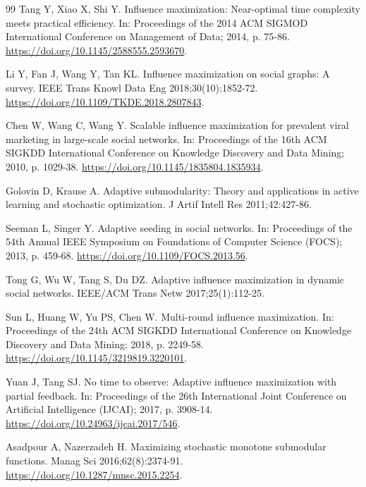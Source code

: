 \documentclass[preprint,11pt]{elsarticle}
\theoremstyle{definition}
\theoremstyle{remark}
\begin{document}
\begin{thebibliography}{99}
Tang Y, Xiao X, Shi Y. Influence maximization: Near-optimal time complexity meets practical efficiency. In: Proceedings of the 2014 ACM SIGMOD International Conference on Management of Data; 2014, p. 75-86. \url{https://doi.org/10.1145/2588555.2593670}.

Li Y, Fan J, Wang Y, Tan KL. Influence maximization on social graphs: A survey. IEEE Trans Knowl Data Eng 2018;30(10):1852-72. \url{https://doi.org/10.1109/TKDE.2018.2807843}.

Chen W, Wang C, Wang Y. Scalable influence maximization for prevalent viral marketing in large-scale social networks. In: Proceedings of the 16th ACM SIGKDD International Conference on Knowledge Discovery and Data Mining; 2010, p. 1029-38. \url{https://doi.org/10.1145/1835804.1835934}.

Golovin D, Krause A. Adaptive submodularity: Theory and applications in active learning and stochastic optimization. J Artif Intell Res 2011;42:427-86.

Seeman L, Singer Y. Adaptive seeding in social networks. In: Proceedings of the 54th Annual IEEE Symposium on Foundations of Computer Science (FOCS); 2013, p. 459-68. \url{https://doi.org/10.1109/FOCS.2013.56}.

Tong G, Wu W, Tang S, Du DZ. Adaptive influence maximization in dynamic social networks. IEEE/ACM Trans Netw 2017;25(1):112-25.

Sun L, Huang W, Yu PS, Chen W. Multi-round influence maximization. In: Proceedings of the 24th ACM SIGKDD International Conference on Knowledge Discovery and Data Mining; 2018, p. 2249-58. \url{https://doi.org/10.1145/3219819.3220101}.

Yuan J, Tang SJ. No time to observe: Adaptive influence maximization with partial feedback. In: Proceedings of the 26th International Joint Conference on Artificial Intelligence (IJCAI); 2017, p. 3908-14. \url{https://doi.org/10.24963/ijcai.2017/546}.

Asadpour A, Nazerzadeh H. Maximizing stochastic monotone submodular functions. Manag Sci 2016;62(8):2374-91. \url{https://doi.org/10.1287/mnsc.2015.2254}.


\end{thebibliography}
\end{document}
